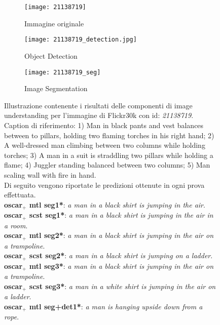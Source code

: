 \begin{figure}[H]
     \centering
     \begin{subfigure}[b]{0.32\textwidth}
         \centering
         \texttt{[image: 21138719]}
         \caption{Immagine originale}
     \end{subfigure}
     \begin{subfigure}[b]{0.32\textwidth}
         \centering
         \texttt{[image: 21138719\_detection.jpg]}
         \caption{Object Detection}
     \end{subfigure}
     \begin{subfigure}[b]{0.32\textwidth}
         \centering
         \texttt{[image: 21138719\_seg]}
         \caption{Image Segmentation}
     \end{subfigure}
     \captionsetup{singlelinecheck=off}
        \caption{Illustrazione contenente i risultati delle componenti di image understanding per l'immagine di Flickr30k con id: \textit{21138719}.
        Caption di riferimento: 1) Man in black pants and vest balances between to pillars, holding two flaming torches in his right hand; 2) A well-dressed man climbing between two columns while holding torches; 3) A man in a suit is straddling two pillars while holding a flame; 4) Juggler standing balanced between two columns; 5) Man scaling wall with fire in hand.\\
        Di seguito vengono riportate le predizioni ottenute in ogni prova effettuata.\\
        \textbf{\acrshort{oscar}$_+$ \acrshort{mtl} seg1*}: \textit{a man in a black shirt is jumping in the air}.\\
        \textbf{\acrshort{oscar}$_+$ \acrshort{scst} seg1*}: \textit{a man in a black shirt is jumping in the air in a room}.\\
        \textbf{\acrshort{oscar}$_+$ \acrshort{mtl} seg2*}: \textit{a man in a black shirt is jumping in the air on a trampoline}.\\
        \textbf{\acrshort{oscar}$_+$ \acrshort{scst} seg2*}: \textit{a man in a black shirt is jumping on a ladder}.\\
        \textbf{\acrshort{oscar}$_+$ \acrshort{mtl} seg3*}: \textit{a man in a black shirt is jumping in the air on a trampoline}.\\
        \textbf{\acrshort{oscar}$_+$ \acrshort{scst} seg3*}: \textit{a man in a white shirt is jumping in the air on a ladder}.\\
        \textbf{\acrshort{oscar}$_+$ \acrshort{mtl} seg+det1*}: \textit{a man is hanging upside down from a rope}.\\
}
\end{figure}
